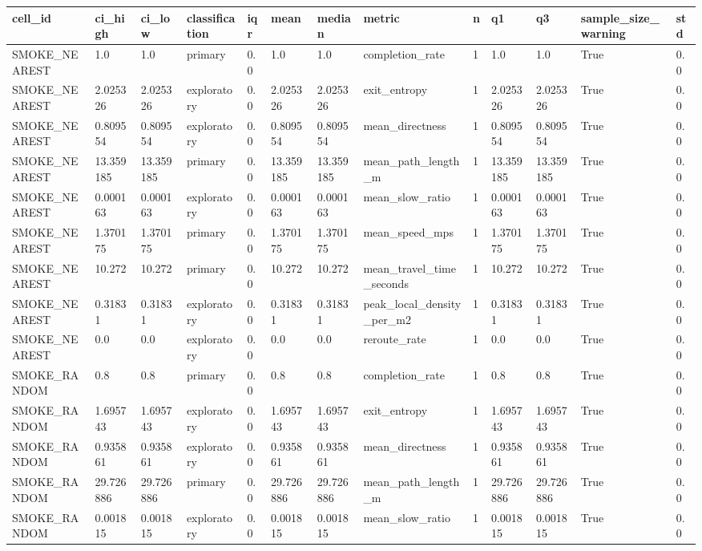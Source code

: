 \begin{tabular}{lllllllllllll}
\hline
cell_id & ci_high & ci_low & classification & iqr & mean & median & metric & n & q1 & q3 & sample_size_warning & std \\
\hline
SMOKE\_NEAREST & 1.0 & 1.0 & primary & 0.0 & 1.0 & 1.0 & completion\_rate & 1 & 1.0 & 1.0 & True & 0.0 \\
SMOKE\_NEAREST & 2.025326 & 2.025326 & exploratory & 0.0 & 2.025326 & 2.025326 & exit\_entropy & 1 & 2.025326 & 2.025326 & True & 0.0 \\
SMOKE\_NEAREST & 0.809554 & 0.809554 & exploratory & 0.0 & 0.809554 & 0.809554 & mean\_directness & 1 & 0.809554 & 0.809554 & True & 0.0 \\
SMOKE\_NEAREST & 13.359185 & 13.359185 & primary & 0.0 & 13.359185 & 13.359185 & mean\_path\_length\_m & 1 & 13.359185 & 13.359185 & True & 0.0 \\
SMOKE\_NEAREST & 0.000163 & 0.000163 & exploratory & 0.0 & 0.000163 & 0.000163 & mean\_slow\_ratio & 1 & 0.000163 & 0.000163 & True & 0.0 \\
SMOKE\_NEAREST & 1.370175 & 1.370175 & primary & 0.0 & 1.370175 & 1.370175 & mean\_speed\_mps & 1 & 1.370175 & 1.370175 & True & 0.0 \\
SMOKE\_NEAREST & 10.272 & 10.272 & primary & 0.0 & 10.272 & 10.272 & mean\_travel\_time\_seconds & 1 & 10.272 & 10.272 & True & 0.0 \\
SMOKE\_NEAREST & 0.31831 & 0.31831 & exploratory & 0.0 & 0.31831 & 0.31831 & peak\_local\_density\_per\_m2 & 1 & 0.31831 & 0.31831 & True & 0.0 \\
SMOKE\_NEAREST & 0.0 & 0.0 & exploratory & 0.0 & 0.0 & 0.0 & reroute\_rate & 1 & 0.0 & 0.0 & True & 0.0 \\
SMOKE\_RANDOM & 0.8 & 0.8 & primary & 0.0 & 0.8 & 0.8 & completion\_rate & 1 & 0.8 & 0.8 & True & 0.0 \\
SMOKE\_RANDOM & 1.695743 & 1.695743 & exploratory & 0.0 & 1.695743 & 1.695743 & exit\_entropy & 1 & 1.695743 & 1.695743 & True & 0.0 \\
SMOKE\_RANDOM & 0.935861 & 0.935861 & exploratory & 0.0 & 0.935861 & 0.935861 & mean\_directness & 1 & 0.935861 & 0.935861 & True & 0.0 \\
SMOKE\_RANDOM & 29.726886 & 29.726886 & primary & 0.0 & 29.726886 & 29.726886 & mean\_path\_length\_m & 1 & 29.726886 & 29.726886 & True & 0.0 \\
SMOKE\_RANDOM & 0.001815 & 0.001815 & exploratory & 0.0 & 0.001815 & 0.001815 & mean\_slow\_ratio & 1 & 0.001815 & 0.001815 & True & 0.0 \\

\end{tabular}
